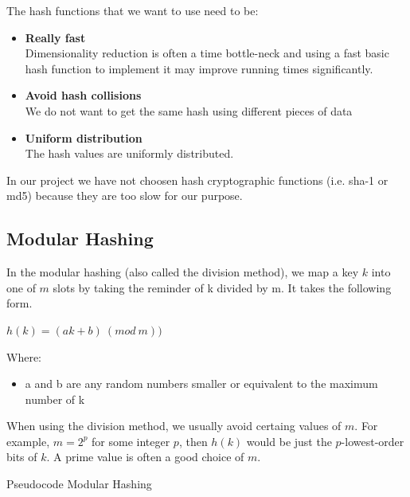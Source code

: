 \documentclass[12pt]{article}
\begin{document}
The hash functions that we want to use need to be: 

\begin{itemize}
\item \textbf{Really fast}\\
Dimensionality reduction is often a time bottle-neck and using a fast basic hash function to implement it may improve running times significantly. 
\item \textbf{Avoid hash collisions}\\
We do not want to get the same hash using different pieces of data %
\item \textbf{Uniform distribution}\\
The hash values are uniformly distributed.

\end{itemize}

In our project we have not choosen hash cryptographic functions (i.e. sha-1 or md5) because they are too slow for our purpose.

\subsection{Modular Hashing}

In the modular hashing (also called the division method), we map a key $k$ into one of $m$ slots by taking the reminder of k divided by m. It takes the following form. 

\begin{center} $h(k) = (ak+b)\  (mod \ m))$ \end{center}

Where: 
\begin{itemize}
\item a and b are any random numbers smaller or equivalent to the maximum number of k 
\end{itemize}

When using the division method, we usually avoid certaing values of $m$. For example, $m = 2^p$ for some integer $p$, then $h(k)$ would be just the $p$-lowest-order bits of $k$. A prime value is often a good choice of $m$.

\begin{center}
\begin{large}
Pseudocode Modular Hashing
\end{large}
\end{center}
\end{document}
